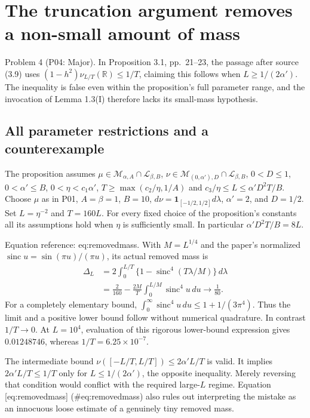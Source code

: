 \documentclass[10pt]{article}
\begin{document}
\section*{The truncation argument removes a non-small amount of mass}
Problem 4 (P04: Major).  In Proposition 3.1, pp. 21–23, the passage after source (3.9) uses \((1-h^2)\nu_{L/T}(\mathbb R)\le1/T\), claiming this follows when \(L\ge1/(2\alpha')\). The inequality is false even within the proposition’s full parameter range, and the invocation of Lemma 1.3(I) therefore lacks its small-mass hypothesis.\par
\subsection*{All parameter restrictions and a counterexample}
The proposition assumes \(\mu\in\mathcal M_{\alpha,A}\cap\mathcal L_{\beta,B}\), \(\nu\in\mathcal M_{(0,\alpha'),D}\cap\mathcal L_{\beta,B}\), \(0<D\le1\), \(0<\alpha'\le B\), \(0<\eta<c_1\alpha'\), \(T\ge\max(c_2/\eta,1/A)\) and \(c_3/\eta\le L\le\alpha'D^2T/B\). Choose \(\mu\) as in P01, \(A=\beta=1\), \(B=10\), \(d\nu=\mathbf 1_{[-1/2,1/2]}d\lambda\), \(\alpha'=2\), and \(D=1/2\). Set \(L=\eta^{-2}\) and \(T=160L\). For every fixed choice of the proposition’s constants all its assumptions hold when \(\eta\) is sufficiently small. In particular \(\alpha'D^2T/B=8L\).\par
Equation reference: eq:removedmass. With \(M=L^{1/4}\) and the paper’s normalized \(\operatorname{sinc}u=\sin(\pi u)/(\pi u)\), its actual removed mass is \[\begin{aligned}
 \Delta_L
 &=2\int_0^{L/T}\{1-\operatorname{sinc}^4(T\lambda/M)\}\,d\lambda\\
 &=\frac{2}{160}
       -\frac{2M}{T}\int_0^{L/M}\operatorname{sinc}^4 u\,du
       \longrightarrow\frac1{80}.
 \end{aligned}\] For a completely elementary bound, \(\int_0^\infty\operatorname{sinc}^4u\,du\le1+1/(3\pi^4)\). Thus the limit and a positive lower bound follow without numerical quadrature. In contrast \(1/T\to0\). At \(L=10^4\), evaluation of this rigorous lower-bound expression gives \(0.01248746\), whereas \(1/T=6.25\times10^{-7}\).\par
The intermediate bound \(\nu([-L/T,L/T])\le2\alpha'L/T\) is valid. It implies \(2\alpha'L/T\le1/T\) only for \(L\le1/(2\alpha')\), the opposite inequality. Merely reversing that condition would conflict with the required large-\(L\) regime. Equation [eq:removedmass] (\#eq:removedmass) also rules out interpreting the mistake as an innocuous loose estimate of a genuinely tiny removed mass.\par
\end{document}
